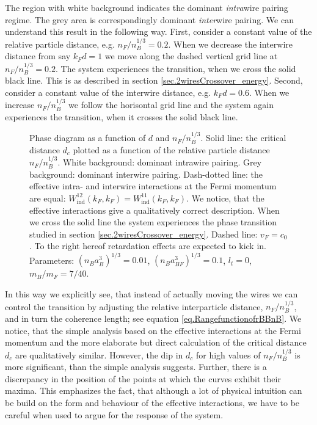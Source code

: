 The region with white background indicates the dominant \textit{intra}wire pairing regime. The grey area is correspondingly dominant \textit{inter}wire pairing. We can understand this result in the following way. First, consider a constant value of the relative particle distance, e.g. $n_F/n_B^{1/3} = 0.2$. When we decrease the interwire distance from say $k_Fd = 1$ we move along the dashed vertical grid line at $n_F/n_B^{1/3} = 0.2$. The system experiences the transition, when we cross the solid black line. This is as described in section \ref{sec.2wiresCrossover_energy}. Second, consider a constant value of the interwire distance, e.g. $k_Fd = 0.6$. When we increase $n_F/n_B^{1/3}$ we follow the horisontal grid line and the system again experiences the transition, when it crosses the solid black line. 

\begin{figure} 
\begin{center}  
  
\caption{Phase diagram as a function of $d$ and $n_F/n_B^{1/3}$. Solid line: the critical distance $d_c$ plotted as a function of the relative particle distance $n_F/n_B^{1/3}$. White background: dominant intrawire pairing. Grey background: dominant interwire pairing. Dash-dotted line: the effective intra- and interwire interactions at the Fermi momentum are equal: $W^{12}_{\text{ind}}(k_F, k_F) = W^{11}_{\text{ind}}(k_F, k_F)$. We notice, that the effective interactions give a qualitatively correct description. When we cross the solid line the system experiences the phase transition studied in section \ref{sec.2wiresCrossover_energy}. Dashed line: $v_F = c_0$. To the right hereof retardation effects are expected to kick in. Parameters: $(n_Ba_B^3)^{1/3} = 0.01$, $(n_Ba_{BF}^3)^{1/3} = 0.1$, $l_t = 0$, $m_B / m_F = 7/40$. }  
\label{fig.twowirescrossovernBdepend}  
\end{center}    
\end{figure}

In this way we explicitly see, that instead of actually moving the wires we can control the transition by adjusting the relative interparticle distance, $n_F/n_B^{1/3}$, and in turn the coherence length; see equation \eqref{eq.RangefunctionofrBBnB}. We notice, that the simple analysis based on the effective interactions at the Fermi momentum and the more elaborate but direct calculation of the critical distance $d_c$ are qualitatively similar. However, the dip in $d_c$ for high values of $n_F/n_B^{1/3}$ is more significant, than the simple analysis suggests. Further, there is a discrepancy in the position of the points at which the curves exhibit their maxima. This emphasizes the fact, that although a lot of physical intuition can be build on the form and behaviour of the effective interactions, we have to be careful when used to argue for the response of the system.

